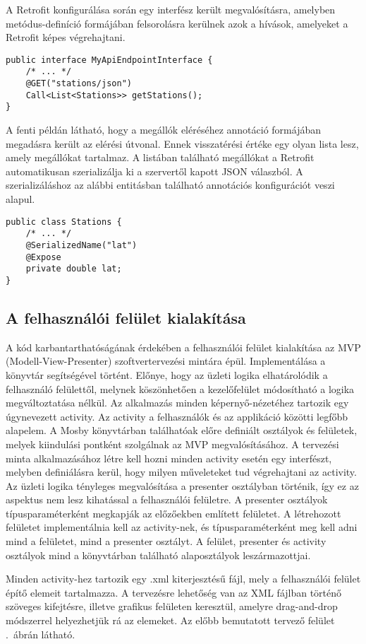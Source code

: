 A Retrofit konfigurálása során egy interfész került megvalósításra, amelyben metódus-definíció formájában felsorolásra kerülnek azok a hívások, amelyeket a Retrofit képes végrehajtani.
\begin{lstlisting}
public interface MyApiEndpointInterface {
	/* ... */
	@GET("stations/json")
    Call<List<Stations>> getStations();
}
\end{lstlisting}
A fenti példán látható, hogy a megállók eléréséhez annotáció formájában megadásra került az elérési útvonal.
Ennek visszatérési értéke egy olyan lista lesz, amely megállókat tartalmaz.
A listában található megállókat a Retrofit automatikusan szerializálja ki a szervertől kapott JSON válaszból.
A szerializáláshoz az alábbi entitásban található annotációs konfigurációt veszi alapul.
\begin{lstlisting}
public class Stations {
	/* ... */
	@SerializedName("lat")
	@Expose
	private double lat;
}
\end{lstlisting}

\subsection*{A felhasználói felület kialakítása}
\label{layout}
A kód karbantarthatóságának érdekében a felhasználói felület kialakítása az MVP (Modell-View-Presenter) szoftvertervezési mintára épül.
Implementálása a  könyvtár segítségével történt.
Előnye, hogy az üzleti logika elhatárolódik a felhasználó felülettől, melynek köszönhetően a kezelőfelület módosítható a logika megváltoztatása nélkül.
Az alkalmazás minden képernyő-nézetéhez tartozik egy úgynevezett activity.
Az activity a felhasználók és az applikáció közötti legfőbb alapelem.
A Mosby könyvtárban találhatóak előre definiált osztályok és felületek, melyek kiindulási pontként szolgálnak az MVP megvalósításához.
A tervezési minta alkalmazásához létre kell hozni minden activity esetén egy interfészt, melyben definiálásra kerül, hogy milyen műveleteket tud végrehajtani az activity.
Az üzleti logika tényleges megvalósítása a presenter osztályban történik, így ez az aspektus nem lesz kihatással a felhasználói felületre.
A presenter osztályok típusparaméterként megkapják az előzőekben említett felületet.
A létrehozott felületet implementálnia kell az activity-nek, és típusparaméterként meg kell adni mind a felületet, mind a presenter osztályt.
A felület, presenter és activity osztályok mind a könyvtárban található alaposztályok leszármazottjai.

Minden activity-hez tartozik egy .xml kiterjesztésű fájl, mely a felhasználói felület építő elemeit tartalmazza.
A tervezésre lehetőség van az XML fájlban történő szöveges kifejtésre, illetve grafikus felületen keresztül, amelyre drag-and-drop módszerrel helyezhetjük rá az elemeket.
Az előbb bemutatott tervező felület .\ ábrán látható.


